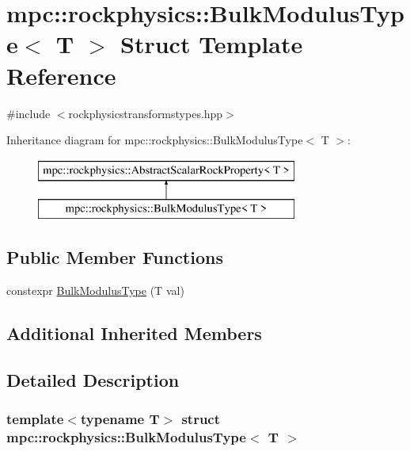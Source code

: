 \hypertarget{structmpc_1_1rockphysics_1_1_bulk_modulus_type}{}\section{mpc\+:\+:rockphysics\+:\+:Bulk\+Modulus\+Type$<$ T $>$ Struct Template Reference}
\label{structmpc_1_1rockphysics_1_1_bulk_modulus_type}


{\ttfamily \#include $<$rockphysicstransformstypes.\+hpp$>$}

Inheritance diagram for mpc\+:\+:rockphysics\+:\+:Bulk\+Modulus\+Type$<$ T $>$\+:\begin{figure}[H]
\begin{center}
\leavevmode
\includegraphics[height=2.000000cm]{structmpc_1_1rockphysics_1_1_bulk_modulus_type}
\end{center}
\end{figure}
\subsection*{Public Member Functions}
\begin{DoxyCompactItemize}
\item 
constexpr \mbox{\hyperlink{structmpc_1_1rockphysics_1_1_bulk_modulus_type_a756c6ccecf169d7f32802d7da8c0fd45}{Bulk\+Modulus\+Type}} (T val)
\end{DoxyCompactItemize}
\subsection*{Additional Inherited Members}


\subsection{Detailed Description}
\subsubsection*{template$<$typename T$>$\newline
struct mpc\+::rockphysics\+::\+Bulk\+Modulus\+Type$<$ T $>$}



